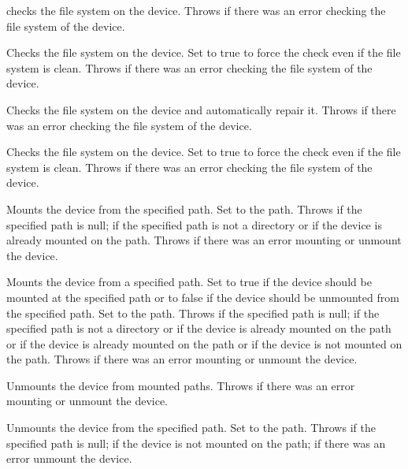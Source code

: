  checks the file system on the device.
Throws  if there was an error checking the file system of the device.

 Checks the file system on the device.
Set  to true to force the check even if the file system is clean.
Throws  if there was an error checking the file system of the device.

 Checks the file system on the device and automatically repair it.
Throws  if there was an error checking the file system of the device.

 Checks the file system on the device. 
Set  to true to force the check even if the file system is clean.
Throws  if there was an error checking the file system of the device.

 Mounts the device from the specified path.
Set  to the \TypeFile{} path.
Throws  if the specified path is null;
 if the specified path is not a directory or if the device is
already mounted on the path. Throws  if there was an 
error mounting or unmount the device.

 Mounts the device from a specified path.
Set  to true if the device should be mounted at the specified
path or to false if the device should be unmounted from the specified path.
Set  to the \TypeFile{} path.
Throws  if the specified path is null;
 if the specified path is not a directory or if the device is
already mounted on the path or if the device is already mounted on the path or if the device
is not mounted on the path. Throws  if there was an 
error mounting or unmount the device.

 Unmounts the device from mounted paths.
Throws  if there was an 
error mounting or unmount the device.

 Unmounts the device from the specified path.
Set  to the \TypeFile{} path.
Throws  if the specified path is null;
 if the device is not mounted on the path;
 if there was an error unmount the device.

